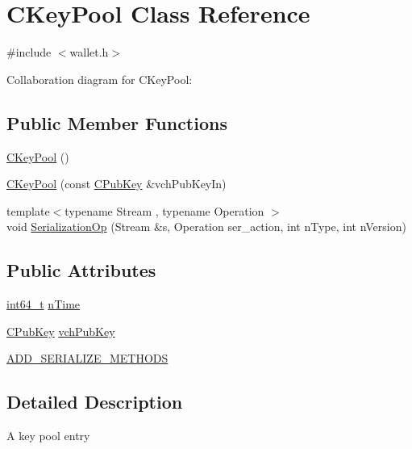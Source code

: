 \hypertarget{class_c_key_pool}{}\section{C\+Key\+Pool Class Reference}
\label{class_c_key_pool}


{\ttfamily \#include $<$wallet.\+h$>$}



Collaboration diagram for C\+Key\+Pool\+:
\subsection*{Public Member Functions}
\begin{DoxyCompactItemize}
\item 
\hyperlink{class_c_key_pool_ab1f33489faff7a7e1edbd61a5a18f604}{C\+Key\+Pool} ()
\item 
\hyperlink{class_c_key_pool_a63e27cd41ea374cc909436b3083b68c4}{C\+Key\+Pool} (const \hyperlink{class_c_pub_key}{C\+Pub\+Key} \&vch\+Pub\+Key\+In)
\item 
{\footnotesize template$<$typename Stream , typename Operation $>$ }\\void \hyperlink{class_c_key_pool_a2589572f0eb90da9237684a16484c03d}{Serialization\+Op} (Stream \&s, Operation ser\+\_\+action, int n\+Type, int n\+Version)
\end{DoxyCompactItemize}
\subsection*{Public Attributes}
\begin{DoxyCompactItemize}
\item 
\hyperlink{stdint_8h_adec1df1b8b51cb32b77e5b86fff46471}{int64\+\_\+t} \hyperlink{class_c_key_pool_aa2f8263f0baf732ad5b4e4b59b482209}{n\+Time}
\item 
\hyperlink{class_c_pub_key}{C\+Pub\+Key} \hyperlink{class_c_key_pool_a937080a4cec1f2b138ebd200557c82b5}{vch\+Pub\+Key}
\item 
\hyperlink{class_c_key_pool_ad4bc93c36031a3e6306c102008be5f51}{A\+D\+D\+\_\+\+S\+E\+R\+I\+A\+L\+I\+Z\+E\+\_\+\+M\+E\+T\+H\+O\+D\+S}
\end{DoxyCompactItemize}


\subsection{Detailed Description}
A key pool entry 

